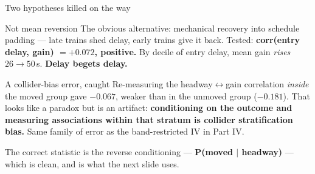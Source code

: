 \documentclass[aspectratio=169,10pt]{beamer}
\newcommand{\hl}[1]{{\color{corange}\textbf{#1}}}
\begin{document}
\begin{frame}{Two hypotheses killed on the way}
  \begin{block}{\small Not mean reversion}
    \small The obvious alternative: mechanical recovery into schedule padding --- late trains
    shed delay, early trains give it back. Tested:
    \textbf{corr(entry delay, gain) $= +0.072$, positive.} By decile of entry delay, mean gain
    \emph{rises} $26 \to 50$\,s. \hl{Delay begets delay.}
  \end{block}

  \vspace{0.5em}
  \begin{alertblock}{\small A collider-bias error, caught}
    \small Re-measuring the headway$\leftrightarrow$gain correlation \emph{inside} the moved
    group gave $-0.067$, weaker than in the unmoved group ($-0.181$). That looks like a
    paradox but is an artifact: \textbf{conditioning on the outcome and measuring
    associations within that stratum is collider stratification bias.} Same family of error
    as the band-restricted IV in Part IV.

    \vspace{0.3em}
    The correct statistic is the reverse conditioning --- \hl{P(moved $\mid$ headway)} ---
    which is clean, and is what the next slide uses.
  \end{alertblock}
\end{frame}
\end{document}
